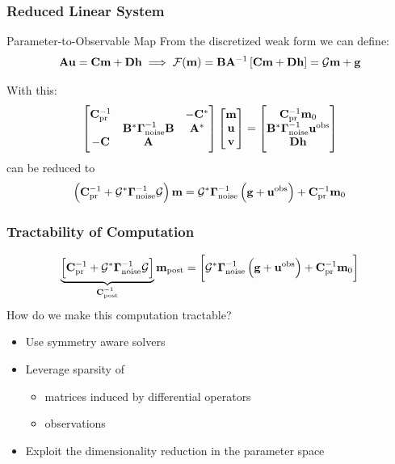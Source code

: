 \documentclass[
    pdf,
    10pt,
    xcolor={svgnames},
  ]{beamer}
\newcommand{\mc}[1]{\mathcal{#1}}
\newcommand{\mat}[1]{\mathbf{{#1}}}
\newcommand{\obs}{\mathbf{u}^{\rm obs}}
\begin{document}
\begin{frame}
  \frametitle{Reduced Linear System}
  \begin{block}{Parameter-to-Observable Map}
    From the discretized weak form we can define:
    \[
      \mat{A}\vb{u} = \mat{C} \vb{m} + \mat{D} \vb{h}
      \implies
      \mc{F}(\vb{m}) = \mat{B} \mat{A}^{-1} \left[
        \mat{C} \vb{m} + \mat{D} \vb{h}
      \right]
      = \mc{G} \vb{m} + \vb{g}
    \]
  \end{block}
  \pause
  With this:
  \[
    \begin{bmatrix}
      \mat{C}_{\rm pr}^{-1} & & -\mat{C}^* \\
       & \mat{B}^* \vb{\Gamma}_{\rm noise}^{-1} \mat{B} & \mat{A}^* \\
      -\mat{C} & \mat{A} & 
    \end{bmatrix}
    \begin{bmatrix} \vb{m} \\ \vb{u} \\ \vb{v} \end{bmatrix}
    = \begin{bmatrix}
      \mat{C}_{\rm pr}^{-1} \vb{m}_0 \\ 
      \mat{B}^* \vb{\Gamma}_{\rm noise}^{-1} \obs \\
      \mat{D} \vb{h}
    \end{bmatrix}
  \]
  can be reduced to
  \[
    \left(
      \mat{C}_{\rm pr}^{-1} + \mc{G}^* \vb{\Gamma}_{\rm noise}^{-1} \mc{G}
    \right)\vb{m}
    = \mc{G}^* \vb{\Gamma}_{\rm noise}^{-1} \left( \vb{g} + \obs \right)
    + \mat{C}_{\rm pr}^{-1} \vb{m}_0
  \]
\end{frame}

\begin{frame}
  \frametitle{Tractability of Computation}
  \[
    \underbrace{\left[
        \mat{C}_{\rm pr}^{-1} + \mc{G}^* \vb{\Gamma}_{\rm noise}^{-1} \mc{G}
    \right]}_{\mat{C}_{\rm post}^{-1}}
    \vb{m}_{\rm post}
    =
    \left[
      \mc{G}^* \vb{\Gamma}_{\rm noise}^{-1} \left( \vb{g} + \obs \right)
      + \mat{C}_{\rm pr}^{-1} \vb{m}_0
    \right]
  \]
  How do we make this computation tractable?
  \pause
  \begin{itemize}
    \item Use symmetry aware solvers
    \item Leverage sparsity of 
      \begin{itemize}
        \item matrices induced by differential operators
        \item observations
      \end{itemize}
    \item Exploit the dimensionality reduction in the parameter space
  \end{itemize}
\end{frame}
\end{document}
